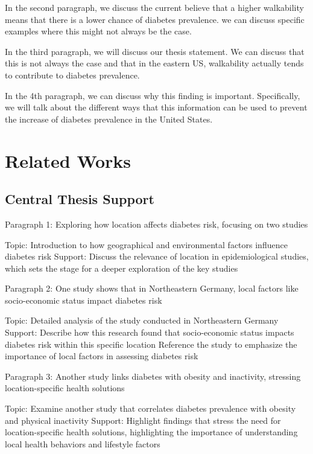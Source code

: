 \documentclass[
]{article}
\begin{document}
In the second paragraph, we discuss the current believe that a higher
walkability means that there is a lower chance of diabetes prevalence.
we can discuss specific examples where this might not always be the
case.

In the third paragraph, we will discuss our thesis statement. We can
discuss that this is not always the case and that in the eastern US,
walkability actually tends to contribute to diabetes prevalence.

In the 4th paragraph, we can discuss why this finding is important.
Specifically, we will talk about the different ways that this
information can be used to prevent the increase of diabetes prevalence
in the United States.

\section{Related Works}\label{related-works}

\subsection{Central Thesis Support}\label{central-thesis-support-1}

Paragraph 1: Exploring how location affects diabetes risk, focusing on
two studies

Topic: Introduction to how geographical and environmental factors
influence diabetes risk Support: Discuss the relevance of location in
epidemiological studies, which sets the stage for a deeper exploration
of the key studies

Paragraph 2: One study shows that in Northeastern Germany, local factors
like socio-economic status impact diabetes risk

Topic: Detailed analysis of the study conducted in Northeastern Germany
Support: Describe how this research found that socio-economic status
impacts diabetes risk within this specific location Reference the study
to emphasize the importance of local factors in assessing diabetes risk

Paragraph 3: Another study links diabetes with obesity and inactivity,
stressing location-specific health solutions

Topic: Examine another study that correlates diabetes prevalence with
obesity and physical inactivity Support: Highlight findings that stress
the need for location-specific health solutions, highlighting the
importance of understanding local health behaviors and lifestyle factors
\end{document}
